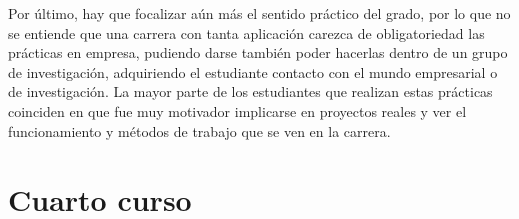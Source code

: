 Por último, hay que focalizar aún más el sentido práctico del grado, por lo que no se 
entiende que una carrera con tanta aplicación carezca de obligatoriedad las prácticas en 
empresa, pudiendo darse también poder hacerlas dentro de un grupo de investigación, 
adquiriendo el estudiante contacto con el mundo empresarial o de investigación. La mayor parte 
de los estudiantes que realizan estas prácticas coinciden en que fue muy motivador implicarse en 
proyectos reales y ver el funcionamiento y métodos de trabajo que se ven en la carrera.
\section{Cuarto curso}

